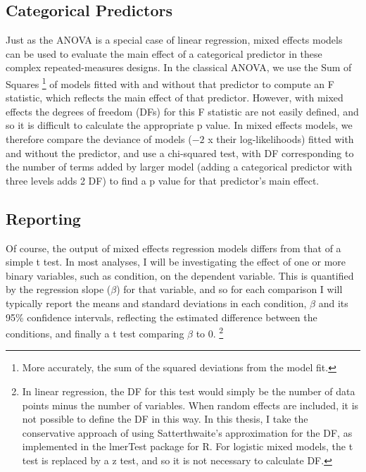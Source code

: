 \subsection{Categorical Predictors}\label{subsec:statistics-catgorical}


Just as the ANOVA is a special case of linear regression,
mixed effects models can be used
to evaluate the main effect of a categorical predictor
in these complex repeated-measures designs.
In the classical ANOVA, we use the Sum of Squares%
\footnote{More accurately, the sum of the squared deviations from the model fit.}
of models fitted with and without that predictor to  compute an F statistic,
which reflects the main effect of that predictor.
However, with mixed effects the degrees of freedom (DFs) for this F statistic
are not easily defined, and so it is difficult to calculate the appropriate p value.
In mixed effects models, we therefore compare
the deviance of models ($-2$ x their log-likelihoods)
fitted with and without the predictor,
and use a chi-squared test,
with DF corresponding to the number of terms added by larger model
(adding a categorical predictor with three levels adds 2 DF)
to find a p value for that predictor's main effect.

\subsection{Reporting}\label{subsec:statistics-reporting}

Of course, the output of mixed effects regression models
differs from that of a simple t test.
In most analyses, I will be investigating the effect of one or more
binary variables, such as condition, on the dependent variable.
This is quantified by the regression slope ($\beta$) for that variable,
and so for each comparison I will typically report
the means and standard deviations in each condition,
$\beta$ and its 95\% confidence intervals,
reflecting the estimated difference between the conditions,
and finally a t test comparing $\beta$ to 0.%
\footnote{
  In linear regression, the DF for this test
  would simply be the number of data points minus the number of variables.
  When random effects are included, it is not possible to define the DF in this way.
  In this thesis, I  take the conservative approach
  of using Satterthwaite’s approximation \citep{Satterthwaite1946} for the DF,
  as implemented in the lmerTest \citep{Kuznetsova2015} package for R.
  For logistic mixed models, the t test is replaced by a z test,
  and so it is not necessary to calculate DF.
}

